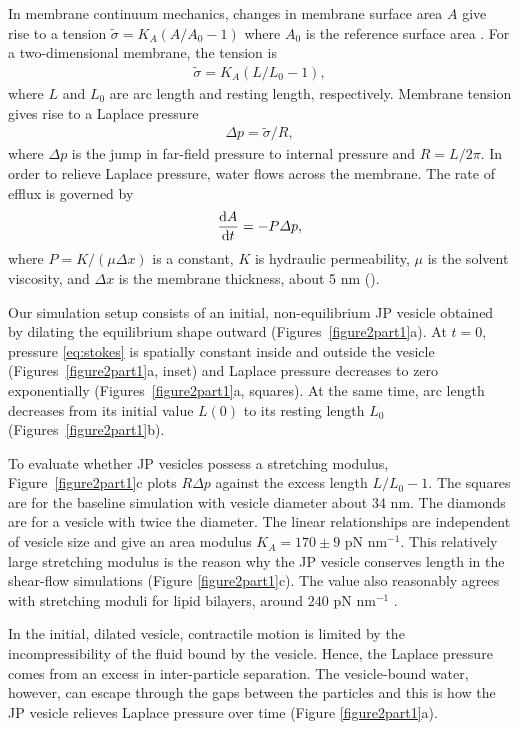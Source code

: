\documentclass[lineno]{jfm}
\begin{document}
In membrane continuum  mechanics, changes in membrane surface area $A$ give rise to a tension
$\tilde \sigma = K_A(A/A_0 - 1)$ where $A_0$ is the reference surface area \citep{NaTr00}. 
For a two-dimensional membrane, the tension is 
\begin{align}
\label{eq:stretch}
\tilde \sigma = K_A\left(L/L_0 - 1 \right),
\end{align}
where $L$ and $L_0$ are arc length and resting length,
respectively. 
Membrane tension gives rise to 
a Laplace pressure 
\begin{align}
\label{eq:LaplacePressure}
\Delta p = \tilde \sigma/R,
\end{align}
where $\Delta p$ is the jump in far-field pressure to internal pressure and
$R = L/2\pi$.
In order to relieve Laplace pressure, 
water flows across the membrane. The rate of efflux is governed by  
\begin{align}
  \label{eq:perm} 
  \frac{\dif A}{\dif t} = - P\Delta p,
\end{align}
where $P = K/(\mu \Delta x)$ is a constant, $K$ is hydraulic permeability, 
$\mu$ is the solvent viscosity, and $\Delta x$ is the 
membrane thickness, about 5 nm
(\cite{chabanon2017, qua-gan-you2021}).

Our  simulation setup consists of an initial, non-equilibrium JP vesicle
obtained by dilating the equilibrium shape outward (Figures~\ref{figure2part1}a).
At $t = 0$, pressure \eqref{eq:stokes} is spatially constant  inside and outside the vesicle 
(Figures~\ref{figure2part1}a, inset)
and Laplace pressure decreases to zero exponentially 
(Figures~\ref{figure2part1}a,  squares).  
At the same time, arc length decreases from its initial value $L(0)$ to its resting length $L_0$
(Figures~\ref{figure2part1}b).

To evaluate whether JP vesicles possess a stretching modulus,
Figure~\ref{figure2part1}c plots $R \Delta p$ against the excess length $L/L_0 - 1$.  The squares
are for the baseline simulation with vesicle diameter about 34 nm.  The diamonds 
are for a vesicle with twice the diameter.  The linear relationships 
are independent of vesicle size and give an area modulus $K_A = 170 \pm 9$ pN nm$^{-1}$.
 This relatively large stretching modulus is the reason why the JP vesicle conserves length in the 
shear-flow simulations (Figure \ref{figure2part1}c).
The value also reasonably agrees with stretching moduli for 
lipid bilayers, around $240$ pN nm$^{-1}$ \citep{NaTr00}.

 In the initial, dilated vesicle,
contractile motion is limited by the incompressibility of the 
fluid bound by the vesicle.  
Hence, the Laplace pressure 
comes from an excess in inter-particle separation.  The vesicle-bound water,
however, can escape through the gaps between the particles and this
is how the JP vesicle relieves Laplace pressure over time (Figure \ref{figure2part1}a).  
\end{document}
